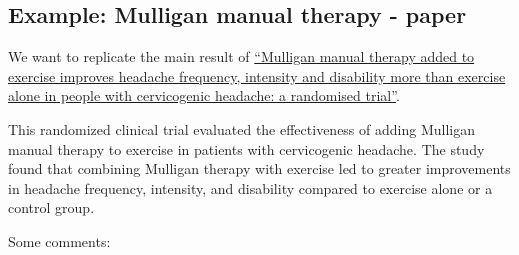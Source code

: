 \documentclass[
]{book}
\begin{document}
\subsection{Example: Mulligan manual therapy - paper}\label{mulligan}

We want to replicate the main result of
\href{https://doi.org/10.1016/j.jphys.2024.06.002}{``Mulligan manual therapy added to exercise improves headache frequency,
intensity and disability more than exercise alone in people with cervicogenic
headache: a randomised trial''}.

This randomized clinical trial evaluated the effectiveness of adding Mulligan manual therapy
to exercise in patients with cervicogenic headache. The study found that combining
Mulligan therapy with exercise led to greater improvements in headache frequency,
intensity, and disability compared to exercise alone or a control group.

Some comments:
\end{document}
